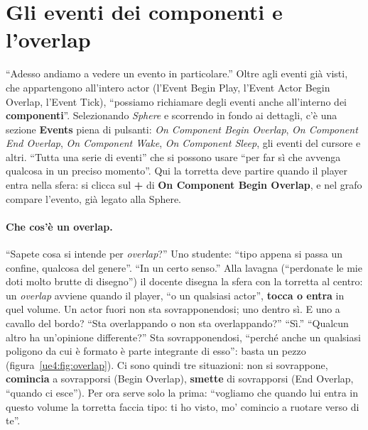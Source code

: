 \section{Gli eventi dei componenti e l'overlap}
\label{ue4:sec:overlap}

``Adesso andiamo a vedere un evento in particolare.'' Oltre agli eventi già visti, che
appartengono all'intero actor (l'Event Begin Play, l'Event Actor Begin Overlap,
l'Event Tick), ``possiamo richiamare degli eventi anche all'interno dei
\textbf{componenti}''. Selezionando \emph{Sphere} e scorrendo in fondo ai dettagli, c'è
una sezione \textbf{Events} piena di pulsanti: \emph{On Component Begin Overlap},
\emph{On Component End Overlap}, \emph{On Component Wake}, \emph{On Component Sleep},
gli eventi del cursore e altri. ``Tutta una serie di eventi'' che si possono usare
``per far sì che avvenga qualcosa in un preciso momento''. Qui la torretta deve partire
quando il player entra nella sfera: si clicca sul \textbf{+} di \textbf{On Component
Begin Overlap}, e nel grafo compare l'evento, già legato alla Sphere.

\paragraph{Che cos'è un overlap.} ``Sapete cosa si intende per \emph{overlap}?''
Uno studente: ``tipo appena si passa un confine, qualcosa del genere''. ``In un certo
senso.'' Alla lavagna (``perdonate le mie doti molto brutte di disegno'') il docente
disegna la sfera con la torretta al centro: un \emph{overlap} avviene quando il player,
``o un qualsiasi actor'', \textbf{tocca o entra} in quel volume. Un actor fuori non sta
sovrapponendosi; uno dentro sì. E uno a cavallo del bordo? ``Sta overlappando o non sta
overlappando?'' ``Sì.'' ``Qualcun altro ha un'opinione differente?'' Sta
sovrapponendosi, ``perché anche un qualsiasi poligono da cui è formato è parte
integrante di esso'': basta un pezzo (figura~\ref{ue4:fig:overlap}). Ci sono quindi tre
situazioni: non si sovrappone, \textbf{comincia} a sovrapporsi (Begin Overlap),
\textbf{smette} di sovrapporsi (End Overlap, ``quando ci esce''). Per ora serve solo la
prima: ``vogliamo che quando lui entra in questo volume la torretta faccia tipo: ti ho
visto, mo' comincio a ruotare verso di te''.

